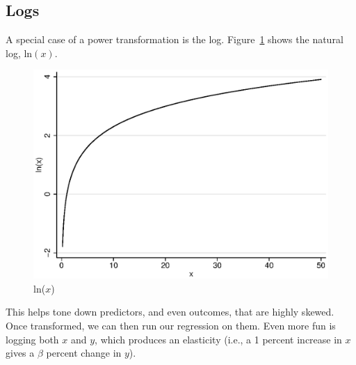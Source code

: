 \subsection{Logs}
\label{sec:logs}
A special case of a power transformation is the log. Figure~\ref{fig:ln} shows the natural log, $\mbox{ln}\left(x\right)$.
\begin{figure}
   \centering
   \includegraphics[angle=0,
           width=.75\textwidth]{ln.eps}
   \caption{ln($x$)}
  \label{fig:ln}
\end{figure}
This helps tone down predictors, and even outcomes, that are highly skewed. Once transformed, we can then run our regression on them. Even more fun is logging both $x$ and $y$, which produces an elasticity (i.e., a 1 percent increase in $x$ gives a $\beta$ percent change in $y$).
